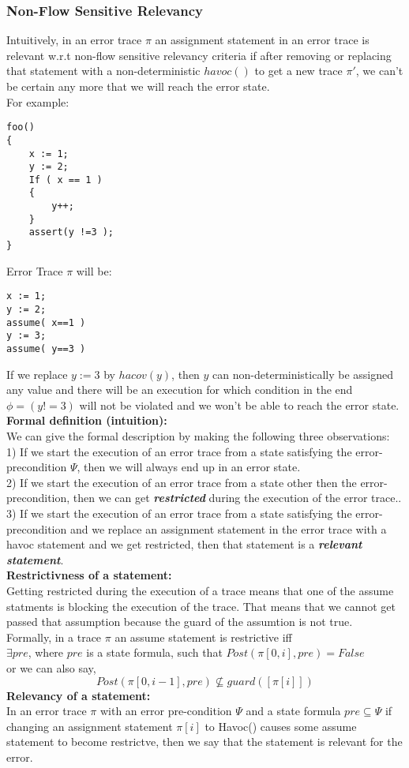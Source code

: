 \documentclass{article}
\begin{document}
\subsubsection{Non-Flow Sensitive Relevancy}
Intuitively, in an error trace $\pi$ an assignment statement in an error trace is relevant w.r.t non-flow sensitive relevancy criteria if after removing or replacing that statement with a non-deterministic $havoc()$ to get a new trace $\pi'$, we can't be certain any more that we will reach the error state.\\
For example:
\begin{lstlisting}
foo()
{
	x := 1;
	y := 2;
	If ( x == 1 )
	{
		y++;
	}
	assert(y !=3 );
}
\end{lstlisting}
Error Trace $\pi$ will be:
\begin{lstlisting}
x := 1;
y := 2;
assume( x==1 )
y := 3;
assume( y==3 )
\end{lstlisting}
If we replace $y:=3$ by $hacov(y)$, then $y$ can non-deterministically be assigned any value and there will be an execution for which condition in the end $\phi = (y!=3)$ will not be violated and we won't be able to reach the error state.\\
\textbf{Formal definition (intuition):}\\
We can give the formal description by making the following three observations: \\
1) If we start the execution of an error trace from a state satisfying the error-precondition $\Psi$, then we will always end up in an error state. \\
2) If we start the execution of an error trace from a state other then the error-precondition, then we can get \textit{\textbf{restricted}} during the execution of the error trace.. \\
3) If we start the execution of an error trace from a state satisfying the error-precondition and we replace an assignment statement in the error trace with a havoc statement and we get restricted, then that statement is a \textit{\textbf{relevant statement}}.\\
\textbf{Restrictivness of a statement:}\\
Getting restricted during the execution of a trace means that one of the assume statments is blocking the execution of the trace. That means that we cannot get passed that assumption because the guard of the assumtion is not true. \\
Formally, in a trace $\pi$ an assume statement is restrictive iff \\
$\exists pre$, where $pre$ is a state formula, such that $Post(\pi[0,i], pre) = False$\\
or we can also say,
$$Post(\pi[0,i-1], pre) \not \subseteq guard([\pi[i]])$$
\textbf{Relevancy of a statement:}\\
In an error trace $\pi$ with an error pre-condition $\Psi$ and a state formula $pre \subseteq \Psi$ if changing an assignment statement $\pi[i]$ to Havoc() causes some assume statement to become restrictve, then we say that the statement is relevant for the error.\\
\end{document}

